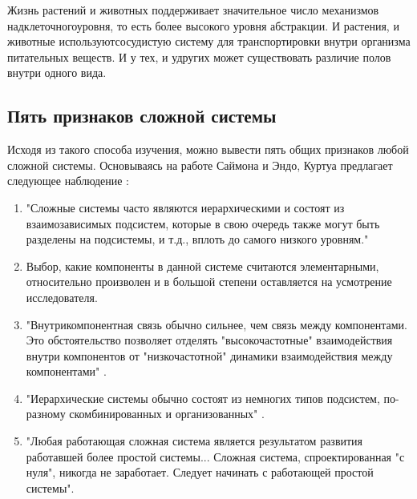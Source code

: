 \documentclass[10pt]{article}
\begin{document}
Жизнь растений и животных поддерживает значительное число механизмов надклеточного\linebreak уровня, то есть более высокого уровня абстракции. И растения, и животные используют\linebreak сосудистую систему для транспортировки внутри организма питательных веществ. И у тех, и у\linebreak других может существовать различие полов внутри одного вида.
 
\subsection{Пять признаков сложной системы}
Исходя из такого способа изучения, можно вывести пять общих признаков любой сложной системы. Основываясь на работе Саймона и Эндо, Куртуа предлагает следующее наблюдение \cite{Courtois}: 
\begin{enumerate}
\item "Сложные системы часто являются иерархическими и состоят из взаимозависимых подсистем, которые в свою очередь также могут быть разделены на подсистемы, и т.д., вплоть до самого низкого уровням." 
\item Выбор, какие компоненты в данной системе считаются элементарными, относительно произволен и в большой степени оставляется на усмотрение исследователя. 
\item "Внутрикомпонентная связь обычно сильнее, чем связь между компонентами. Это обстоятельство позволяет отделять "высокочастотные" взаимодействия внутри компонентов от "низкочастотной" динамики взаимодействия между компонентами" \cite{Sciences}. 
\item "Иерархические системы обычно состоят из немногих типов подсистем, по-разному скомбинированных и организованных" \cite{Ibid}. 
\item "Любая работающая сложная система является результатом развития работавшей более простой системы... Сложная система, спроектированная "с нуля", никогда не заработает. Следует начинать с работающей простой системы". 
\end{enumerate}
\end{document}
